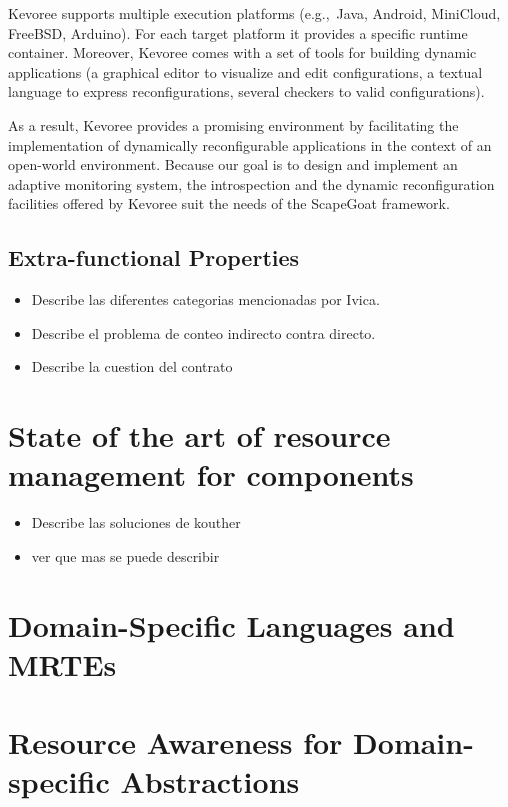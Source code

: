 Kevoree supports multiple execution platforms (e.g.,~Java, Android, MiniCloud, FreeBSD, Arduino). For each target platform it provides a specific runtime container. 
Moreover, Kevoree comes with a set of tools for building dynamic applications (a graphical editor to visualize and edit configurations, a textual language to express reconfigurations, several checkers to valid configurations). 

As a result, Kevoree provides a promising environment by facilitating the implementation of dynamically reconfigurable applications in the context of an open-world environment.
Because our goal is to design and implement an adaptive monitoring system, the introspection and the dynamic reconfiguration facilities offered by Kevoree suit the needs of the ScapeGoat framework.


\subsection{Extra-functional Properties}
\begin{itemize}
\item Describe las diferentes categorias mencionadas por Ivica.
\item Describe el problema de conteo indirecto contra directo.
\item Describe la cuestion del contrato
\end{itemize}
\section{State of the art of resource management for components} \label{sec:component-leverage}
\begin{itemize}
\item Describe las soluciones de kouther
\item ver que mas se puede describir
\end{itemize}

\section{Domain-Specific Languages and MRTEs} \label{sec:DSL-on-MRTEs}

\section{Resource Awareness for Domain-specific Abstractions} \label{sec:resource-awareness-for-dsl}

